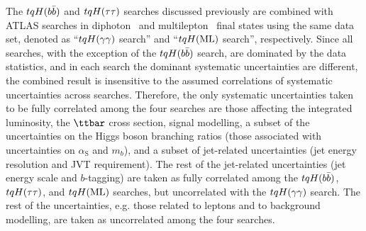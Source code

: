 The $tqH(b\bar{b})$ and $tqH(\tau\tau)$ searches discussed previously are combined with ATLAS searches in 
diphoton~\cite{Aaboud:2017mfd} and multilepton~\cite{Aaboud:2018pob} final states using the same data set, 
denoted as ``$tqH(\gamma\gamma)$ search'' and ``$tqH(\mathrm{ML})$ search'', respectively.
Since all searches, with the exception of the $tqH(b\bar{b})$ search, are dominated by the data statistics, 
and in each search the dominant systematic uncertainties are different, the combined result is 
insensitive to the assumed correlations of systematic uncertainties across searches.
Therefore, the only systematic uncertainties taken to be fully correlated among the four searches are 
those affecting the integrated luminosity, the $\ttbar$ cross section, signal modelling, a subset of the uncertainties
on the Higgs boson branching ratios (those associated with uncertainties on $\alpha_\mathrm{S}$ and $m_b$), 
and a subset of jet-related uncertainties (jet energy resolution and JVT requirement). 
The rest of the jet-related uncertainties (jet energy scale and $b$-tagging) are taken as fully correlated among 
the $tqH(b\bar{b})$, $tqH(\tau\tau)$, and $tqH(\mathrm{ML})$ searches, but uncorrelated with the $tqH(\gamma\gamma)$ search. The rest of the uncertainties, 
e.g. those related to leptons and to background modelling, are taken as uncorrelated among the four searches. 



